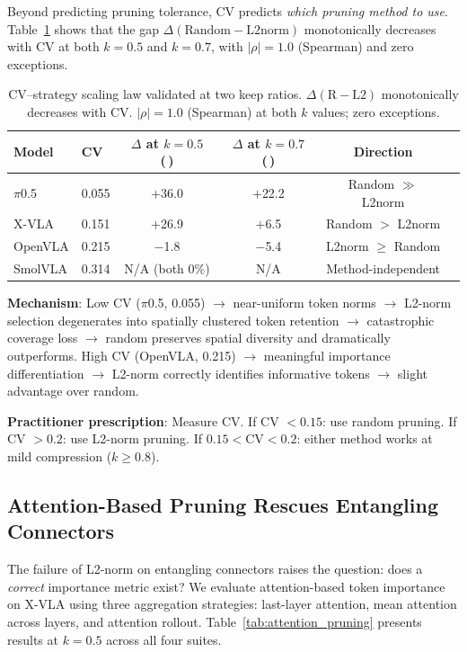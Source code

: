 \documentclass[10pt,letterpaper]{article}
\newcommand{\pp}{\,\text{pp}}
\begin{document}
Beyond predicting pruning tolerance, CV predicts \emph{which pruning method to use}. Table~\ref{tab:scaling_law} shows that the gap $\Delta(\text{Random} - \text{L2norm})$ monotonically decreases with CV at both $k\!=\!0.5$ and $k\!=\!0.7$, with $|\rho| = 1.0$ (Spearman) and zero exceptions.

\begin{table}[t]
\centering
\caption{CV--strategy scaling law validated at two keep ratios. $\Delta(\text{R}-\text{L2})$ monotonically decreases with CV. $|\rho|\!=\!1.0$ (Spearman) at both $k$ values; zero exceptions.}
\label{tab:scaling_law}
\small
\begin{tabular}{llcccl}
\toprule
Model & CV & $\Delta$ at $k\!=\!0.5$ (\pp) & $\Delta$ at $k\!=\!0.7$ (\pp) & Direction \\
\midrule
$\pi$0.5 & 0.055 & $+$36.0 & $+$22.2 & Random $\gg$ L2norm \\
X-VLA & 0.151 & $+$26.9 & $+$6.5 & Random $>$ L2norm \\
OpenVLA & 0.215 & $-$1.8 & $-$5.4 & L2norm $\geq$ Random \\
SmolVLA & 0.314 & N/A (both 0\%) & N/A & Method-independent \\
\bottomrule
\end{tabular}
\end{table}

\textbf{Mechanism}: Low CV ($\pi$0.5, 0.055) $\to$ near-uniform token norms $\to$ L2-norm selection degenerates into spatially clustered token retention $\to$ catastrophic coverage loss $\to$ random preserves spatial diversity and dramatically outperforms. High CV (OpenVLA, 0.215) $\to$ meaningful importance differentiation $\to$ L2-norm correctly identifies informative tokens $\to$ slight advantage over random.

\textbf{Practitioner prescription}: Measure CV. If CV $< 0.15$: use random pruning. If CV $> 0.2$: use L2-norm pruning. If $0.15 < \text{CV} < 0.2$: either method works at mild compression ($k \geq 0.8$).


\subsection{Attention-Based Pruning Rescues Entangling Connectors}
\label{sec:attention_pruning}

The failure of L2-norm on entangling connectors raises the question: does a \emph{correct} importance metric exist? We evaluate attention-based token importance on X-VLA using three aggregation strategies: last-layer attention, mean attention across layers, and attention rollout. Table~\ref{tab:attention_pruning} presents results at $k\!=\!0.5$ across all four suites.
\end{document}
